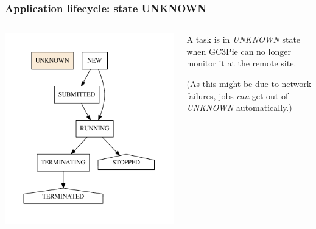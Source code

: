\documentclass[english,serif,mathserif,xcolor=pdftex,dvipsnames,table]{beamer}
\begin{document}
\begin{frame}[fragile]
\frametitle{Application lifecycle: state UNKNOWN}

\begin{columns}[c]
  \begin{column}{0.5\textwidth}
    \includegraphics[height=0.7\textheight]{fig/states-UNKNOWN}
  \end{column}
  \begin{column}{0.5\textwidth}
    \raggedleft
    A task is in \emph{UNKNOWN} state when GC3Pie can no
    longer monitor it at the remote site.

    \+
    (As this might be due to network failures, jobs \emph{can} get
    out of \emph{UNKNOWN} automatically.)
  \end{column}
\end{columns}
\end{frame}
\end{document}

